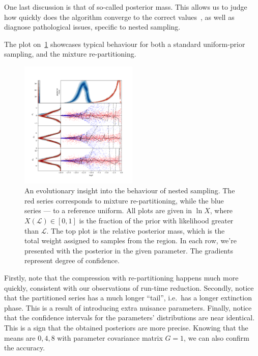 \documentclass[usenatbib]{mnras}
\begin{document}
One last discussion is that of so-called posterior mass. This allows
us to judge how quickly does the algorithm converge to the correct
values~\cite{higson2018nestcheck}, as well as diagnose pathological
issues, specific to nested sampling.

The plot on~\cref{fig:higson} showcases typical behaviour for both
a standard uniform-prior sampling, and the mixture re-partitioning.

\begin{figure}
\includegraphics[width=0.5\textwidth]{./illustrations/higson.png}
\caption{An evolutionary insight into the behaviour of nested sampling. The \color{red} red \color{black} series corresponds to mixture re-partitioning, while the \color{blue} blue \color{black} series --- to a reference uniform. All plots are given in \(\ln X\), where \(X(\mathcal{L}) \in [0,1]\) is the fraction of the prior with likelihood greater than \(\mathcal{L}\). The top plot is the relative posterior mass, which is the total weight assigned to samples from the region. In each row, we're presented with the posterior in the given parameter. The gradients represent degree of confidence.\label{fig:higson}}
\end{figure}

Firstly, note that the compression with re-partitioning happens much
more quickly, consistent with our observations of run-time
reduction. Secondly, notice that the partitioned series has a much
longer ``tail'', i.e.~has a longer extinction phase. This is a
result of introducing extra nuisance parameters. Finally, notice
that the confidence intervals for the parameters' distributions are
near identical. This is a sign that the obtained posteriors are more
precise. Knowing that the means are \({0, 4, 8}\) with parameter
covariance matrix \(G = 1\), we can also confirm the accuracy.
\end{document}
